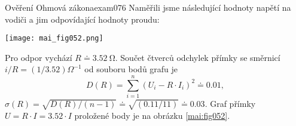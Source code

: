 \begin{mathexam}{Ověření Ohmová zákona}{exam076}
  Naměřili jsme následující hodnoty napětí na vodiči a jim odpovídající hodnoty proudu:
  
  \begin{center}
  \end{center}

  {\centering
  \captionsetup{type=figure}
  \texttt{[image: mai\_fig052.png]}
  \par}
  Pro odpor vychází \(R\doteq\qty{3.52}{\ohm}\). Součet čtverců odchylek přímky se směrnicí \(i/R
  = (1/\num{3.52})\Omega^{-1}\) od souboru bodů grafu je
  \begin{equation*}
    D(R) = \sum_{i=1}^{n}(U_i - R\cdot I_i)^2 \doteq\num{0.01},
  \end{equation*}
  \(\sigma(R) = \sqrt{D(R)/(n-1)}\doteq\sqrt{(\num{0.11}/11)}\doteq\num{0.03}\).  Graf přímky \(U
  = R\cdot I = \num{3.52}\cdot I\) proložené body je na obrázku \ref{mai:fig052}.
\end{mathexam}